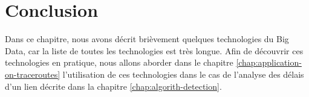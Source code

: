\section{Conclusion}

Dans ce chapitre,  nous avons décrit brièvement  quelques technologies du Big Data, car la liste de toutes les technologies est très longue. Afin de découvrir ces technologies en pratique, nous allons aborder dans le chapitre \ref{chap:application-on-traceroutes} l'utilisation de ces technologies dans le cas de l'analyse des délais d'un lien décrite dans la chapitre \ref{chap:algorith-detection}.    









